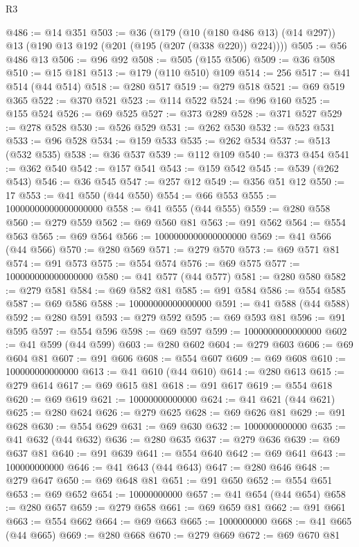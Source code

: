 \begin{lexlean}{R3}
\begin{coremodule}
@486 := @14 @351
@503 := @36
    (@179
      (@10 (@180 @486 @13) (@14 @297))
      @13
      (@190 @13 @192 (@201 (@195 (@207 (@338 @220)) @224))))
@505 := @56 @486 @13
@506 := @96 @92
@508 := @505 (@155 @506)
@509 := @36 @508
@510 := @15 @181
@513 := @179 (@110 @510) @109
@514 := 256
@517 := @41 @514 (@44 @514)
@518 := @280 @517
@519 := @279 @518
@521 := @69 @519 @365
@522 := @370 @521
@523 := @114 @522
@524 := @96 @160
@525 := @155 @524
@526 := @69 @525
@527 := @373 @289
@528 := @371 @527
@529 := @278 @528
@530 := @526 @529
@531 := @262 @530
@532 := @523 @531
@533 := @96 @528
@534 := @159 @533
@535 := @262 @534
@537 := @513 (@532 @535)
@538 := @36 @537
@539 := @112 @109
@540 := @373 @454
@541 := @362 @540
@542 := @157 @541
@543 := @159 @542
@545 := @539 (@262 @543)
@546 := @36 @545
@547 := @257 @12
@549 := @356 @51 @12
@550 := 17
@553 := @41 @550 (@44 @550)
@554 := @66 @553
@555 := 10000000000000000000
@558 := @41 @555 (@44 @555)
@559 := @280 @558
@560 := @279 @559
@562 := @69 @560 @81
@563 := @91 @562
@564 := @554 @563
@565 := @69 @564
@566 := 1000000000000000000
@569 := @41 @566 (@44 @566)
@570 := @280 @569
@571 := @279 @570
@573 := @69 @571 @81
@574 := @91 @573
@575 := @554 @574
@576 := @69 @575
@577 := 100000000000000000
@580 := @41 @577 (@44 @577)
@581 := @280 @580
@582 := @279 @581
@584 := @69 @582 @81
@585 := @91 @584
@586 := @554 @585
@587 := @69 @586
@588 := 10000000000000000
@591 := @41 @588 (@44 @588)
@592 := @280 @591
@593 := @279 @592
@595 := @69 @593 @81
@596 := @91 @595
@597 := @554 @596
@598 := @69 @597
@599 := 1000000000000000
@602 := @41 @599 (@44 @599)
@603 := @280 @602
@604 := @279 @603
@606 := @69 @604 @81
@607 := @91 @606
@608 := @554 @607
@609 := @69 @608
@610 := 100000000000000
@613 := @41 @610 (@44 @610)
@614 := @280 @613
@615 := @279 @614
@617 := @69 @615 @81
@618 := @91 @617
@619 := @554 @618
@620 := @69 @619
@621 := 10000000000000
@624 := @41 @621 (@44 @621)
@625 := @280 @624
@626 := @279 @625
@628 := @69 @626 @81
@629 := @91 @628
@630 := @554 @629
@631 := @69 @630
@632 := 1000000000000
@635 := @41 @632 (@44 @632)
@636 := @280 @635
@637 := @279 @636
@639 := @69 @637 @81
@640 := @91 @639
@641 := @554 @640
@642 := @69 @641
@643 := 100000000000
@646 := @41 @643 (@44 @643)
@647 := @280 @646
@648 := @279 @647
@650 := @69 @648 @81
@651 := @91 @650
@652 := @554 @651
@653 := @69 @652
@654 := 10000000000
@657 := @41 @654 (@44 @654)
@658 := @280 @657
@659 := @279 @658
@661 := @69 @659 @81
@662 := @91 @661
@663 := @554 @662
@664 := @69 @663
@665 := 1000000000
@668 := @41 @665 (@44 @665)
@669 := @280 @668
@670 := @279 @669
@672 := @69 @670 @81

\end{coremodule}
\end{lexlean}
